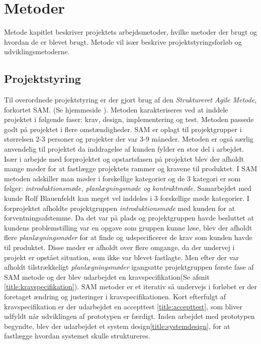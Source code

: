 \chapter{Metoder}
Metode kapitlet beskriver projektets arbejdsmetoder, hvilke metoder der brugt og hvordan de er blevet brugt. Metode vil især beskrive projektstyringsforløb og udviklingsmetoderne. 

\section{Projektstyring}
Til overordnede projektstyring er der gjort brug af den \textit{Struktureret Agile Metode}, forkortet SAM. (Se hjemmeside ). Metoden karakteriseres ved at inddele projektet i følgende faser: krav, design, implementering og test. Metoden passede godt på projektet i flere omstændigheder. SAM er oplagt til projektgrupper i størrelsen 2-3 personer og projekter der var 3-9 måneder. Metoden er også særlig anvendelig til projektet da inddragelse af kunden fylder en stor del i arbejdet. 
Især i arbejde med forprojektet og opstartsfasen på projektet blev der afholdt mange møder for at fastlægge projektets rammer og kravene til produktet. I SAM metoden adskiller man møder i forskellige kategorier og de 3 kategori er som følger: \textit{introduktionsmøde, planlægningsmøde og kontraktmøde}. Samarbejdet med kunde Rolf Blauenfeldt kan meget vel inddeles i 3 forskellige møde kategorier. I forprojektet afholdte projektgruppen \textit{introduktionsmøde} med kunden for at forventningsafstemme. Da det var på plads og projektgruppen havde besluttet at kundens problemstilling var en opgave som gruppen kunne løse, blev der afholdt flere \textit{planlægningsmøder} for at finde og udspecificerer de  krav som kunden havde til produktet. Disse møder er afholdt over flere omgange, da der undervej i projekt er opstået situation, som ikke var blevet fastlagte. Men efter der var afholdt tilstrækkeligt \textit{planlægningsmøder} igangsatte projektgruppen første fase af SAM metode og der blev udarbejdet en kravspecifikation(Se afsnit \ref{title:kravspecifikation}). SAM metoder er et iterativ så undervejs i forløbet er der foretaget ændring og justeringer i kravspecifikationen. Kort efterfulgt af kravspecifikation er der udarbejdet en accepttest \ref{title:accepttest}, som bliver udfyldt når udviklingen af prototypen er færdigt. Inden arbejdet med prototypen begyndte, blev der udarbejdet et system design\ref{title:systemdesign}, for at fastlægge hvordan systemet skulle struktureres. 

